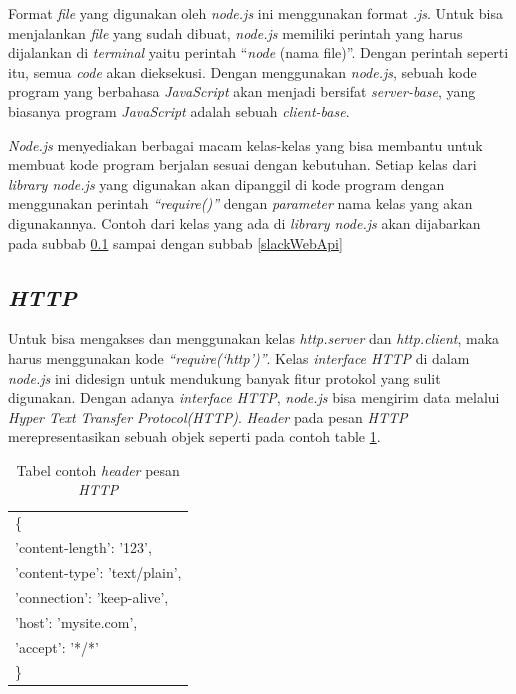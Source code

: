 Format \textit{file} yang digunakan oleh \textit{node.js} ini menggunakan format \textit{.js}. Untuk bisa menjalankan \textit{file} yang sudah dibuat, \textit{node.js} memiliki perintah yang harus dijalankan di \textit{terminal} yaitu perintah ``\textit{node} (nama file)''. Dengan perintah seperti itu, semua \textit{code} akan dieksekusi. Dengan menggunakan \textit{node.js}, sebuah kode program yang berbahasa \textit{JavaScript} akan menjadi bersifat \textit{server-base}, yang biasanya program \textit{JavaScript} adalah sebuah \textit{client-base}.

\textit{Node.js} menyediakan berbagai macam kelas-kelas yang bisa membantu untuk membuat kode program berjalan sesuai dengan kebutuhan. Setiap kelas dari \textit{library node.js} yang digunakan akan dipanggil di kode program dengan menggunakan perintah \textit{``require()''} dengan \textit{parameter} nama kelas yang akan digunakannya. Contoh dari kelas yang ada di \textit{library node.js} akan dijabarkan pada subbab \ref{http} sampai dengan subbab \ref{slackWebApi}

\subsection{\textit{HTTP}}
\label{http}
Untuk bisa mengakses dan menggunakan kelas \textit{http.server} dan \textit{http.client}, maka harus menggunakan kode \textit{``require(`http')''}. Kelas \textit{interface HTTP} di dalam \textit{node.js} ini didesign untuk mendukung banyak fitur protokol yang sulit digunakan. Dengan adanya \textit{interface HTTP}, \textit{node.js} bisa mengirim data melalui \textit{Hyper Text Transfer Protocol(HTTP)}. \textit{Header} pada pesan \textit{HTTP} merepresentasikan sebuah objek seperti pada contoh table \ref{tab:contoh_header_pesan_http}. 

\begin{table}[H]
	\centering 
	\caption{Tabel contoh \textit{header} pesan \textit{HTTP}}
	\label{tab:contoh_header_pesan_http}
	\begin{tabular}{|p{6cm}|}
	\toprule
	\{\\
	'content-length': '123',\\
  	'content-type': 'text/plain',\\
  	'connection': 'keep-alive',\\
  	'host': 'mysite.com',\\
  	'accept': '*/*' \\
  	\}\\
	\bottomrule
\end{tabular}  
\end{table}

